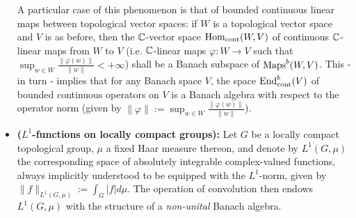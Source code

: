 \begin{example}
\begin{itemize}
                        A particular case of this phenomenon is that of bounded continuous linear maps between topological vector spaces: if $W$ is a topological vector space and $V$ is as before, then the $\mathbb{C}$-vector space $\mathrm{Hom}_{\mathrm{cont}}(W, V)$ of continuous $\mathbb{C}$-linear maps from $W$ to $V$ (i.e. $\mathbb{C}$-linear maps $\varphi: W \to V$ such that $\sup_{w \in W} \frac{\|\varphi(w)\|}{\|w\|} < +\infty$) shall be a Banach subspace of $\mathrm{Maps}^b(W, V)$. This - in turn - implies that for any Banach space $V$, the space $\mathrm{End}_{\mathrm{cont}}^b(V)$ of bounded continuous operators on $V$ is a Banach algebra with respect to the operator norm (given by $\|\varphi\| := \sup_{w \in W} \frac{\|\varphi(w)\|}{\|w\|}$). 
                        \item \textbf{($L^1$-functions on locally compact groups):} Let $G$ be a locally compact topological group, $\mu$ a fixed Haar measure thereon, and denote by $L^1(G, \mu)$ the corresponding space of absolutely integrable complex-valued functions, always implicitly understood to be equipped with the $L^1$-norm, given by $\|f\|_{L^1(G, \mu)} := \int_G |f| d\mu$. The operation of convolution then endows $L^1(G, \mu)$ with the structure of a \textit{non-unital} Banach algebra.
                    \end{itemize}
            \end{example}
            
